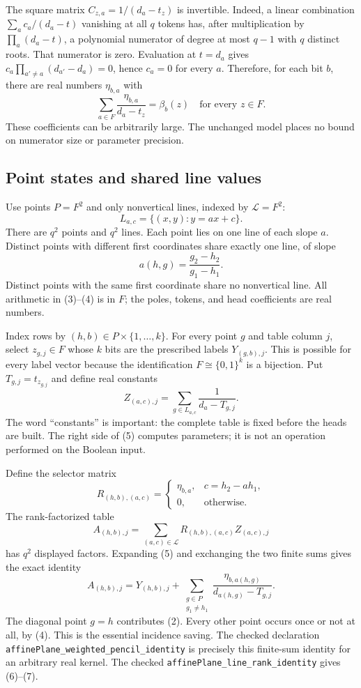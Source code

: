 \documentclass[11pt]{article}
\begin{document}
The square matrix $C_{z,a}=1/(d_a-t_z)$ is invertible. Indeed, a
linear combination $\sum_a c_a/(d_a-t)$ vanishing at all $q$ tokens
has, after multiplication by $\prod_a(d_a-t)$, a polynomial numerator
of degree at most $q-1$ with $q$ distinct roots. That numerator is
zero. Evaluation at $t=d_a$ gives
$c_a\prod_{a'\ne a}(d_{a'}-d_a)=0$, hence $c_a=0$ for every $a$.
Therefore, for each bit $b$, there are real numbers $\eta_{b,a}$ with
\[
 \sum_{a\in F}\frac{\eta_{b,a}}{d_a-t_z}=\beta_b(z)
 \quad\text{for every }z\in F.
 \tag{2}
\]
These coefficients can be arbitrarily large. The unchanged model
places no bound on numerator size or parameter precision.

\subsection{Point states and shared line values}
Use points $P=F^2$ and only nonvertical lines, indexed by
$\mathcal L=F^2$:
\[
 L_{a,c}=\{(x,y):y=ax+c\}.
 \tag{3}
\]
There are $q^2$ points and $q^2$ lines. Each point lies on one line
of each slope $a$. Distinct points with different first coordinates
share exactly one line, of slope
\[
 a(h,g)=\frac{g_2-h_2}{g_1-h_1}.
 \tag{4}
\]
Distinct points with the same first coordinate share no nonvertical
line. All arithmetic in (3)--(4) is in $F$; the poles, tokens, and
head coefficients are real numbers.

Index rows by $(h,b)\in P\times\{1,\ldots,k\}$. For every point
$g$ and table column $j$, select $z_{g,j}\in F$ whose $k$ bits are
the prescribed labels $Y_{(g,b),j}$. This is possible for every
label vector because the identification $F\cong\{0,1\}^k$ is a
bijection. Put $T_{g,j}=t_{z_{g,j}}$ and define real constants
\[
 Z_{(a,c),j}=\sum_{g\in L_{a,c}}\frac1{d_a-T_{g,j}}.
 \tag{5}
\]
The word ``constants'' is important: the complete table is fixed before
the heads are built. The right side of (5) computes parameters; it is
not an operation performed on the Boolean input.

Define the selector matrix
\[
 R_{(h,b),(a,c)}=
 \begin{cases}\eta_{b,a},&c=h_2-ah_1,\\0,&\text{otherwise.}\end{cases}
 \tag{6}
\]
The rank-factorized table
\[
 A_{(h,b),j}=\sum_{(a,c)\in\mathcal L}
               R_{(h,b),(a,c)}Z_{(a,c),j}
 \tag{7}
\]
has $q^2$ displayed factors. Expanding (5) and exchanging the two
finite sums gives the exact identity
\[
 A_{(h,b),j}=Y_{(h,b),j}
 +\sum_{\substack{g\in P\\g_1\ne h_1}}
 \frac{\eta_{b,a(h,g)}}{d_{a(h,g)}-T_{g,j}}.
 \tag{8}
\]
The diagonal point $g=h$ contributes (2). Every other point occurs
once or not at all, by (4). This is the essential incidence saving.
The checked declaration
\texttt{affinePlane\_weighted\_pencil\_identity} is precisely this
finite-sum identity for an arbitrary real kernel. The checked
\texttt{affinePlane\_line\_rank\_identity} gives (6)--(7).
\end{document}
